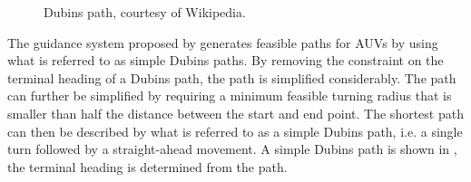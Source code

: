 \begin{figure}[h!]
    \centering
	\caption[Dubins path.]{Dubins path, courtesy of Wikipedia.}
	\label{fig:dubins_path}
\end{figure}

The guidance system proposed by \citet{Scibilia2012} generates feasible paths for AUVs by using what is referred to as simple Dubins paths. By removing the constraint on the terminal heading of a Dubins path, the path is simplified considerably. The path can further be simplified by requiring a minimum feasible turning radius that is smaller than half the distance between the start and end point. The shortest path can then be described by what is referred to as a simple Dubins path, i.e. a single turn followed by a straight-ahead movement. A simple Dubins path is shown in , the terminal heading is determined from the path.


